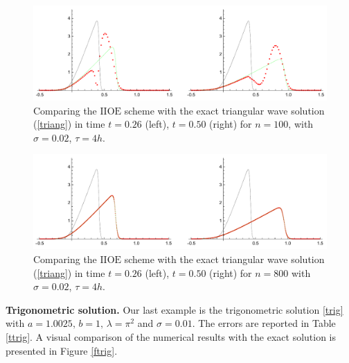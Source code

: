 \documentclass[../include.tex]{subfiles}
\begin{document}
\begin{figure}[h!]
	\centering
	\includegraphics[width=\textwidth]{figures/tri100.pdf}
	\caption{Comparing the $\mathrm{IIOE}$ scheme with the exact triangular wave solution {\rm (\ref{triang})} in time $ t = 0.26 $ (left), $ t = 0.50 $ (right) for $ n=100 $, with $ \sigma=0.02 $,  $ \tau = 4h $.}
	\label{fig:triang-osc}
\end{figure}

\begin{figure}[h]
	\centering
	\includegraphics[width=\textwidth]{figures/tri800.pdf}
	\caption{Comparing the $\mathrm{IIOE}$ scheme with the exact triangular wave solution {\rm (\ref{triang})} in time $ t = 0.26 $ (left), $ t = 0.50 $ (right) for $ n=800 $ with $ \sigma=0.02 $,  $ \tau = 4h $.}
	\label{fig:triang}
\end{figure}


\textbf{Trigonometric solution.} Our last example is the trigonometric solution \eqref{trig} with $ a = 1.0025,\,b=1,\,\lambda = \pi^2 $ and $ \sigma = 0.01 $.
The errors are reported in Table \ref{ttrig}. A visual comparison of the numerical results with the exact solution is presented in Figure \ref{ftrig}.
\end{document}
